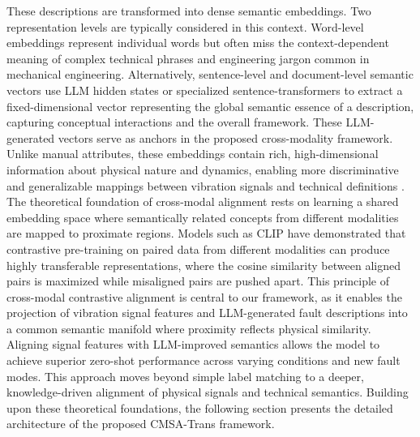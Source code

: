 These descriptions are transformed into dense semantic embeddings. Two representation levels are typically considered in this context. Word-level embeddings represent individual words but often miss the context-dependent meaning of complex technical phrases and engineering jargon common in mechanical engineering. Alternatively, sentence-level and document-level semantic vectors use LLM hidden states or specialized sentence-transformers to extract a fixed-dimensional vector representing the global semantic essence of a description, capturing conceptual interactions and the overall framework. These LLM-generated vectors serve as anchors in the proposed cross-modality framework. Unlike manual attributes, these embeddings contain rich, high-dimensional information about physical nature and dynamics, enabling more discriminative and generalizable mappings between vibration signals and technical definitions \cite{brown2020language, devlin2018bert, li2024industrial}. The theoretical foundation of cross-modal alignment rests on learning a shared embedding space where semantically related concepts from different modalities are mapped to proximate regions. Models such as CLIP have demonstrated that contrastive pre-training on paired data from different modalities can produce highly transferable representations, where the cosine similarity between aligned pairs is maximized while misaligned pairs are pushed apart. This principle of cross-modal contrastive alignment is central to our framework, as it enables the projection of vibration signal features and LLM-generated fault descriptions into a common semantic manifold where proximity reflects physical similarity. Aligning signal features with LLM-improved semantics allows the model to achieve superior zero-shot performance across varying conditions and new fault modes. This approach moves beyond simple label matching to a deeper, knowledge-driven alignment of physical signals and technical semantics. Building upon these theoretical foundations, the following section presents the detailed architecture of the proposed CMSA-Trans framework.
